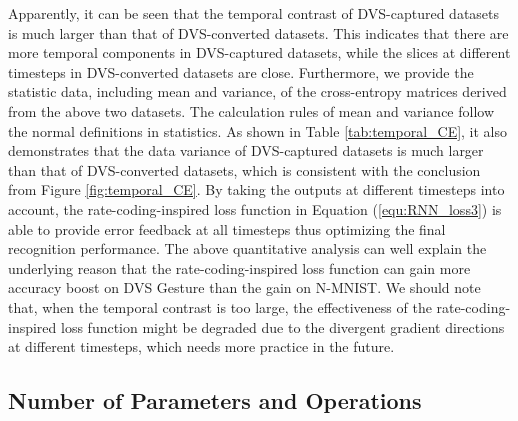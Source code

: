 \documentclass[journal,10pt,twocolumn]{IEEETran}
\begin{document}
\begin{table}[!htbp]
\caption{Mean and variance of the cross-entropy matrices.}
\label{tab:temporal_CE}
\vspace{2pt}
\centering
\renewcommand\arraystretch{1.3}
\end{table}

Apparently, it can be seen that the temporal contrast of DVS-captured datasets is much larger than that of DVS-converted datasets. This indicates that there are more temporal components in DVS-captured datasets, while the slices at different timesteps in DVS-converted datasets are close. Furthermore, we provide the statistic data, including mean and variance, of the cross-entropy matrices derived from the above two datasets. The calculation rules of mean and variance follow the normal definitions in statistics. As shown in Table \ref{tab:temporal_CE}, it also demonstrates that the data variance of DVS-captured datasets is much larger than that of DVS-converted datasets, which is consistent with the conclusion from Figure \ref{fig:temporal_CE}. By taking the outputs at different timesteps into account, the rate-coding-inspired loss function in Equation (\ref{equ:RNN_loss3}) is able to provide error feedback at all timesteps thus optimizing the final recognition performance. The above quantitative analysis can well explain the underlying reason that the rate-coding-inspired loss function can gain more accuracy boost on DVS Gesture than the gain on N-MNIST. We should note that, when the temporal contrast is too large, the effectiveness of the rate-coding-inspired loss function might be degraded due to the divergent gradient directions at different timesteps, which needs more practice in the future.

\subsection{Number of Parameters and Operations}
\end{document}
